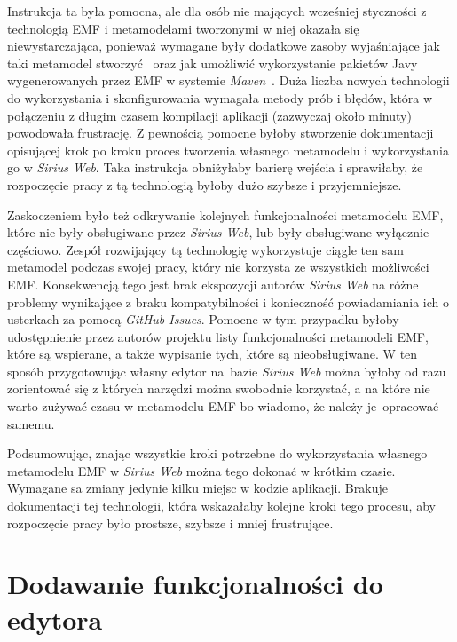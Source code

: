 Instrukcja ta była pomocna, ale dla osób nie mających wcześniej styczności z
technologią \gls{EMF} i metamodelami tworzonymi w niej okazała się
niewystarczająca, ponieważ wymagane były dodatkowe zasoby wyjaśniające jak taki
metamodel stworzyć~\cite{dokumentacja-sirius-desktop,dokumentacja-aql} oraz jak
umożliwić wykorzystanie pakietów Javy wygenerowanych przez \gls{EMF} w systemie
\emph{Maven}~\cite{maven-tycho-tutorial}.
Duża liczba nowych technologii do wykorzystania i skonfigurowania wymagała
metody prób i błędów, która w połączeniu z długim czasem kompilacji aplikacji
(zazwyczaj około minuty) powodowała frustrację. Z pewnością pomocne byłoby
stworzenie dokumentacji opisującej krok po kroku proces tworzenia własnego
metamodelu i wykorzystania go w \emph{Sirius Web}. Taka instrukcja obniżyłaby
barierę wejścia i sprawiłaby, że rozpoczęcie pracy z tą technologią byłoby dużo
szybsze i przyjemniejsze.

Zaskoczeniem było też odkrywanie kolejnych funkcjonalności metamodelu
\gls{EMF}, które nie były obsługiwane przez \emph{Sirius Web}, lub były
obsługiwane wyłącznie częściowo. Zespół rozwijający tą technologię wykorzystuje
ciągle ten sam metamodel podczas swojej pracy, który nie korzysta ze
wszystkich możliwości \gls{EMF}. Konsekwencją tego jest brak ekspozycji autorów
\emph{Sirius Web} na różne problemy wynikające z braku kompatybilności i
konieczność powiadamiania ich o usterkach za pomocą \emph{GitHub Issues}.
Pomocne w tym przypadku byłoby udostępnienie przez autorów projektu listy
funkcjonalności metamodeli \gls{EMF}, które są wspierane, a także wypisanie
tych, które są nieobsługiwane. W ten sposób przygotowując własny edytor
na~bazie
\emph{Sirius Web} można byłoby od razu zorientować się z których narzędzi można
swobodnie korzystać, a na które nie warto zużywać czasu w metamodelu \gls{EMF}
bo wiadomo, że należy je~opracować samemu.

Podsumowując, znając wszystkie kroki potrzebne do wykorzystania własnego
metamodelu \gls{EMF} w \emph{Sirius Web} można tego dokonać w krótkim czasie.
Wymagane sa zmiany jedynie kilku miejsc w kodzie aplikacji. Brakuje
dokumentacji tej technologii, która wskazałaby kolejne kroki tego
procesu, aby rozpoczęcie pracy było prostsze, szybsze i mniej frustrujące.

\section{Dodawanie funkcjonalności do edytora}


